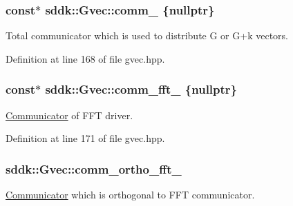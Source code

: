 \subsubsection[{comm\+\_\+}]{ const$\ast$ sddk\+::\+Gvec\+::comm\+\_\+ \{nullptr\}\hspace{0.3cm}{\ttfamily [private]}}\label{classsddk_1_1_gvec_af8b6dd15077c6c925d16d57fbd5a54a1}


Total communicator which is used to distribute G or G+k vectors. 



Definition at line 168 of file gvec.\+hpp.

\hypertarget{classsddk_1_1_gvec_a14f019949de6fd1fa0f1b6c688984787}{}
\subsubsection[{comm\+\_\+fft\+\_\+}]{ const$\ast$ sddk\+::\+Gvec\+::comm\+\_\+fft\+\_\+ \{nullptr\}\hspace{0.3cm}{\ttfamily [private]}}\label{classsddk_1_1_gvec_a14f019949de6fd1fa0f1b6c688984787}


\hyperlink{classsddk_1_1_communicator}{Communicator} of F\+F\+T driver. 



Definition at line 171 of file gvec.\+hpp.

\hypertarget{classsddk_1_1_gvec_aa8bf9350f829ce50c9b6036fff8a5609}{}
\subsubsection[{comm\+\_\+ortho\+\_\+fft\+\_\+}]{ sddk\+::\+Gvec\+::comm\+\_\+ortho\+\_\+fft\+\_\+\hspace{0.3cm}{\ttfamily [private]}}\label{classsddk_1_1_gvec_aa8bf9350f829ce50c9b6036fff8a5609}


\hyperlink{classsddk_1_1_communicator}{Communicator} which is orthogonal to F\+F\+T communicator. 



